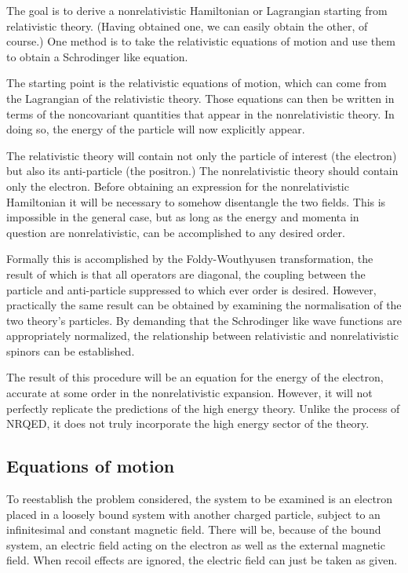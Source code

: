 The goal is to derive a nonrelativistic Hamiltonian or Lagrangian starting from relativistic theory.  (Having obtained one, we can easily obtain the other, of course.)  One method is to take the relativistic equations of motion and use them to obtain a Schrodinger like equation.

The starting point is the relativistic equations of motion, which can come from the Lagrangian of the relativistic theory.  Those equations can then be written in terms of the noncovariant quantities that appear in the nonrelativistic theory.  In doing so, the energy of the particle will now explicitly appear.

The relativistic theory will contain not only the particle of interest (the electron) but also its anti-particle (the positron.)  The nonrelativistic theory should contain only the electron.  Before obtaining an expression for the nonrelativistic Hamiltonian it will be necessary to somehow disentangle the two fields.  This is impossible in the general case, but as long as the energy and momenta in question are nonrelativistic, can be accomplished to any desired order.

Formally this is accomplished by the Foldy-Wouthyusen transformation, the result of which is that all operators are diagonal, the coupling between the particle and anti-particle suppressed to which ever order is desired.  However, practically the same result can be obtained by examining the normalisation of the two theory's particles.  By demanding that the Schrodinger like wave functions are appropriately normalized, the relationship between relativistic and nonrelativistic spinors can be established.

The result of this procedure will be an equation for the energy of the electron, accurate at some order in the nonrelativistic expansion.  However, it will not perfectly replicate the predictions of the high energy theory.  Unlike the process of NRQED, it does not truly incorporate the high energy sector of the theory.



\subsection{Equations of motion}

To reestablish the problem considered, the system to be examined is an electron placed in a loosely bound system with another charged particle, subject to an infinitesimal and constant magnetic field.  There will be, because of the bound system, an electric field acting on the electron as well as the external magnetic field.  When recoil effects are ignored, the electric field can just be taken as given.

